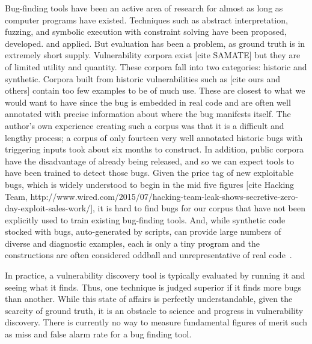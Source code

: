 \label{sec:motivation}

Bug-finding tools have been an active area of research for almost as long as computer programs have existed. 
Techniques such as abstract interpretation, fuzzing, and symbolic execution with constraint solving have been proposed, developed. and applied.
But evaluation has been a problem, as  ground truth is in extremely short supply.
Vulnerability corpora exist [cite SAMATE] but they are of limited utility and quantity.
These corpora fall into two categories: historic and synthetic.
Corpora built from historic vulnerabilities such as [cite ours and others] contain too few examples to be of much use.
These are closest to what we would want to have since the bug is embedded in real code and are often well annotated with precise information about where the bug manifests itself.
The author's own experience creating such a corpus was that it is a difficult and lengthy process; a corpus of only fourteen very well annotated historic bugs with triggering inputs took about six months to construct. 
In addition, public corpora have the disadvantage of already being released, and so we can expect tools to have been trained to detect those bugs.
Given the price tag of new exploitable bugs, which is widely understood to begin in the mid five figures [cite Hacking Team, http://www.wired.com/2015/07/hacking-team-leak-shows-secretive-zero-day-exploit-sales-work/], it is hard to find bugs for our corpus that have not been explicitly used to train existing bug-finding tools.
And, while synthetic code stocked with bugs, auto-generated by scripts, can provide large numbers of diverse and diagnostic examples, each is only a tiny program and the constructions are often considered oddball and unrepresentative of real code~\cite{kendra}.

In practice, a vulnerability discovery tool is typically evaluated by running it and seeing what it finds. 
Thus, one technique is judged superior if it finds more bugs than another.
While this state of affairs is perfectly understandable, given the scarcity of ground truth, it is an obstacle to science and progress in vulnerability discovery.
There is currently no way to measure fundamental figures of merit such as miss and false alarm rate for a bug finding tool.

